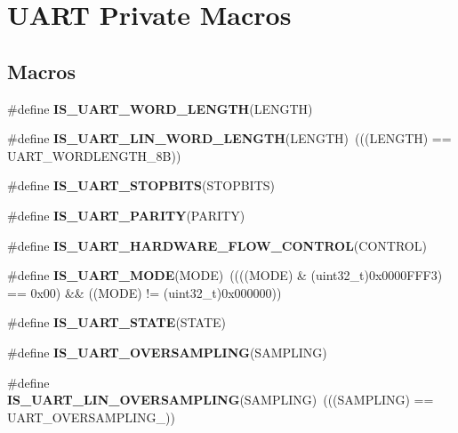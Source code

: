 \hypertarget{group___u_a_r_t___private___macros}{}\section{U\+A\+RT Private Macros}
\label{group___u_a_r_t___private___macros}
\subsection*{Macros}
\begin{DoxyCompactItemize}
\item 
\#define {\bfseries I\+S\+\_\+\+U\+A\+R\+T\+\_\+\+W\+O\+R\+D\+\_\+\+L\+E\+N\+G\+TH}(L\+E\+N\+G\+TH)
\item 
\#define {\bfseries I\+S\+\_\+\+U\+A\+R\+T\+\_\+\+L\+I\+N\+\_\+\+W\+O\+R\+D\+\_\+\+L\+E\+N\+G\+TH}(L\+E\+N\+G\+TH)~(((L\+E\+N\+G\+TH) == U\+A\+R\+T\+\_\+\+W\+O\+R\+D\+L\+E\+N\+G\+T\+H\+\_\+8B))\hypertarget{group___u_a_r_t___private___macros_ga12e732e82119829947fb0c97da82bd69}{}\label{group___u_a_r_t___private___macros_ga12e732e82119829947fb0c97da82bd69}

\item 
\#define {\bfseries I\+S\+\_\+\+U\+A\+R\+T\+\_\+\+S\+T\+O\+P\+B\+I\+TS}(S\+T\+O\+P\+B\+I\+TS)
\item 
\#define {\bfseries I\+S\+\_\+\+U\+A\+R\+T\+\_\+\+P\+A\+R\+I\+TY}(P\+A\+R\+I\+TY)
\item 
\#define {\bfseries I\+S\+\_\+\+U\+A\+R\+T\+\_\+\+H\+A\+R\+D\+W\+A\+R\+E\+\_\+\+F\+L\+O\+W\+\_\+\+C\+O\+N\+T\+R\+OL}(C\+O\+N\+T\+R\+OL)
\item 
\#define {\bfseries I\+S\+\_\+\+U\+A\+R\+T\+\_\+\+M\+O\+DE}(M\+O\+DE)~((((M\+O\+DE) \& (uint32\+\_\+t)0x0000\+F\+F\+F3) == 0x00) \&\& ((\+M\+O\+D\+E) != (uint32\+\_\+t)0x000000))\hypertarget{group___u_a_r_t___private___macros_ga748d45fbdc96c743bee170b749f961ba}{}\label{group___u_a_r_t___private___macros_ga748d45fbdc96c743bee170b749f961ba}

\item 
\#define {\bfseries I\+S\+\_\+\+U\+A\+R\+T\+\_\+\+S\+T\+A\+TE}(S\+T\+A\+TE)
\item 
\#define {\bfseries I\+S\+\_\+\+U\+A\+R\+T\+\_\+\+O\+V\+E\+R\+S\+A\+M\+P\+L\+I\+NG}(S\+A\+M\+P\+L\+I\+NG)
\item 
\#define {\bfseries I\+S\+\_\+\+U\+A\+R\+T\+\_\+\+L\+I\+N\+\_\+\+O\+V\+E\+R\+S\+A\+M\+P\+L\+I\+NG}(S\+A\+M\+P\+L\+I\+NG)~(((S\+A\+M\+P\+L\+I\+NG) == U\+A\+R\+T\+\_\+\+O\+V\+E\+R\+S\+A\+M\+P\+L\+I\+N\+G\+\_))\hypertarget{group___u_a_r_t___private___macros_gacd5577cca731f8ef51badd665f6aa5e6}{}\label{group___u_a_r_t___private___macros_gacd5577cca731f8ef51badd665f6aa5e6}


\end{DoxyCompactItemize}
